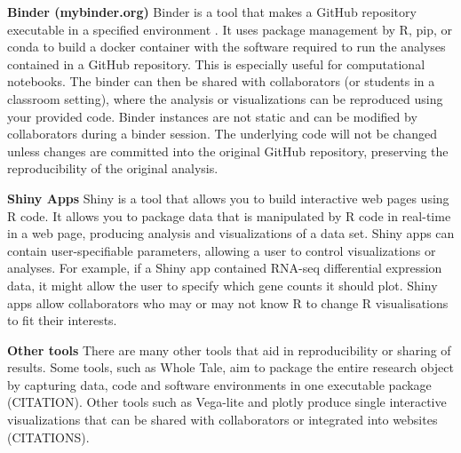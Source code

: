\documentclass[10pt,letterpaper]{article}
\begin{document}


\begin{greybox}{
 \textbf{Binder (mybinder.org)} Binder is a tool that makes a GitHub repository executable in a specified environment \cite{Jupyter2018}. 
It uses package management by R, pip, or conda to build a docker container with the software required to run the analyses contained in a GitHub repository. 
This is especially useful for computational notebooks. 
The binder can then be shared with collaborators (or students in a classroom setting), where the analysis or visualizations can be reproduced using your provided code. 
Binder instances are not static and can be modified by collaborators during a binder session. 
The underlying code will not be changed unless changes are committed into the original GitHub repository, preserving the reproducibility of the original analysis.
 
 \textbf{Shiny Apps} Shiny is a tool that allows you to build interactive web pages using R code. 
It allows you to package data that is manipulated  by R code in real-time in a web page, producing analysis and visualizations of a data set. 
Shiny apps can contain user-specifiable parameters, allowing a user to control visualizations or analyses. 
For example, if a Shiny app contained RNA-seq differential expression data, it might allow the user to specify which gene counts it should plot. 
Shiny apps allow collaborators who may or may not know R to change R visualisations to fit their interests.   
 
 \textbf{Other tools} There are many other tools that aid in reproducibility or sharing of results. 
Some tools, such as Whole Tale, aim to package the entire research object by capturing data, code and software environments in one executable package (CITATION). 
Other tools such as Vega-lite and plotly produce single interactive visualizations that can be shared with collaborators or integrated into websites (CITATIONS).
}
\end{greybox}
\end{document}
